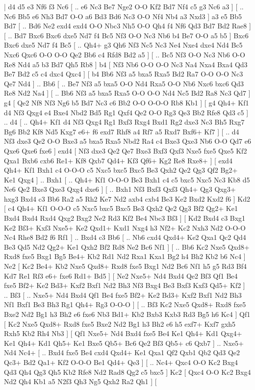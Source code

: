 \makegametitle 
|   d4   d5    e3   Nf6    f3  Nc6 [ .. e6  Nc3 Be7  Nge2 O-O  Kf2 Bd7  Nf4 c5  g3 Nc6  a3   ]  [ .. Nc6  Bb5 e6  Nh3 Bd7  O-O a6  Bd3 Bd6  Nc3 O-O  Nf4 Nb4  a3 Nxd3   ]  a3   e5    Bb5   Bd7 [ .. Bd6  Ne2 exd4  exd4 O-O  Nbc3 Nh5  O-O Qh4  f4 Nf6  Qd3 Bd7  Bd2 Rae8   ]  [ .. Bd7  Bxc6 Bxc6  dxe5 Nd7  f4 Bc5  Nf3 O-O  Nc3 Nb6  b4 Be7  O-O a5  b5   ]  Bxc6   Bxc6    dxe5   Nd7    f4   Bc5 [ .. Qh4+  g3 Qh6  Nf3 Nc5  Nc3 Ne4  Nxe4 dxe4  Nd4 Bc5  Nxc6 Qxc6  O-O O-O  Qe2 Bb6  c4 Rfd8  Bd2 a5   ]  [ .. Bc5  Nf3 O-O  Nc3 Nb6  O-O Re8  Nd4 a5  b3 Bd7  Qh5 Rb8   ]  b4 [  Nf3 Nb6  O-O O-O  Nc3 Na4  Nxa4 Bxa4  Qd3 Be7  Bd2 c5  c4 dxc4  Qxc4   ]  [  b4 Bb6  Nf3 a5  bxa5 Rxa5  Bd2 Ra7  O-O O-O  Nc3 Qe7  Nd4   ] .. Bb6    [ .. Be7  Nf3 a5  bxa5 O-O  Nd4 Rxa5  O-O Nb6  Nxc6 bxc6  Qd3 Re8  Nd2 Na4   ]  [ .. Bb6  Nf3 a5  bxa5 Rxa5  O-O O-O  Nd4 Nc5  Bd2 Ra8  Nc3 Qd7   ]  g4 [  Qe2 Nf8  Nf3 Ng6  b5 Bd7  Nc3 c6  Bb2 O-O  O-O-O Rb8  Kb1   ]  [  g4 Qh4+  Kf1 d4  Nf3 Qxg4  e4 Bxe4  Nbd2 Bd5  Rg1 Qxf4  Qe2 O-O  Rg3 Qe3  Bb2 Rfe8  Qd3 c5   ] .. d4 [ .. Qh4+  Kf1 d4  Nf3 Qxg4  Rg1 Bxf3  Rxg4 Bxd1  Rg2 dxe3  Nc3 Bh5  Rxg7 Bg6  Bb2 Kf8  Nd5 Kxg7  e6+ f6  exd7 Rhf8  a4 Rf7  a5 Rxd7  Bxf6+ Kf7   ]  [ .. d4  Nf3 dxe3  Qe2 O-O  Bxe3 a5  bxa5 Rxa5  Nbd2 Ra4  c4 Bxe3  Qxe3 Nb6  O-O Qd7  e6 Qxe6  Qxe6 fxe6   ]  exd4 [  Nf3 dxe3  Qe2 Qe7  Bxe3 Bxf3  Qxf3 Nxe5  fxe5 Qxe5  Kf2 Qxa1  Bxb6 cxb6  Re1+ Kf8  Qxb7 Qd4+  Kf3 Qf6+  Kg2 Re8  Rxe8+   ]  [  exd4 Qh4+  Kf1 Bxh1  c4 O-O-O  c5 Nxc5  bxc5 Bxc5  Be3 Qxh2  Qe2 Qg3  Qf2 Bg2+  Ke1 Qxg4   ] .. Bxh1 [ .. Qh4+  Kf1 O-O-O  Be3 Bxh1  c4 c5  bxc5 Nxc5  Nc3 Kb8  d5 Ne6  Qe2 Bxe3  Qxe3 Qxg4  dxe6   ]  [ .. Bxh1  Nf3 Bxf3  Qxf3 Qh4+  Qg3 Qxg3+  hxg3 Bxd4  c3 Bb6  Ra2 a5  Rh2 Ke7  Nd2 axb4  cxb4 Be3  Ke2 Bxd2  Kxd2 f6   ]  Kd2 [  c4 Qh4+  Kf1 O-O-O  c5 Nxc5  bxc5 Bxc5  Be3 Qxh2  Qe2 Qg3  Bf2 Qg2+  Ke1 Bxd4  Bxd4 Rxd4  Qxg2 Bxg2  Ne2 Rd3  Kf2 Be4  Nbc3 Bf3   ]  [  Kd2 Bxd4  c3 Bxg1  Ke2 Bf3+  Kxf3 Nxe5+  Ke2 Qxd1+  Kxd1 Nxg4  h3 Nf2+  Kc2 Nxh3  Nd2 O-O-O  Nc4 Rhe8  Bd2 f6  Rf1   ] .. Bxd4    c3   Bb6 [ .. Nb6  cxd4 Qxd4+  Ke2 Qxa1  Qc2 Qd4  Be3 Qd5  Nd2 Qg2+  Ke1 Qxh2  Bf2 Rd8  Ne2 Bc6  Nf1   ]  [ .. Bb6  Kc2 Nxe5  Qxd8+ Rxd8  fxe5 Bxg1  Bg5 Be4+  Kb2 Rd1  Nd2 Rxa1  Kxa1 Bg2  h4 Bh2  Kb2 b6  Nc4   ]  Ne2 [  Kc2 Be4+  Kb2 Nxe5  Qxd8+ Rxd8  fxe5 Bxg1  Nd2 Bc6  Nf1 h5  g5 Rd3  Bf4 Kd7  Re1 Rf3  e6+ fxe6  Rd1+ Bd5   ]  [  Ne2 Nxe5+  Nd4 Bxd4  Qe2 Bf3  Qf1 Be4  fxe5 Bf2+  Ke2 Bd3+  Kxf2 Bxf1  Nd2 Bh3  Nf3 Bxg4  Be3 Bxf3  Kxf3 Qd5+  Kf2   ] .. Bf3 [ .. Nxe5+  Nd4 Bxd4  Qf1 Be4  fxe5 Bf2+  Ke2 Bd3+  Kxf2 Bxf1  Nd2 Bh3  Nf1 Bxf1  Be3 Bh3  Rg1 Qh4+  Rg3 O-O-O   ]  [ .. Bf3  Kc2 Nxe5  Qxd8+ Rxd8  fxe5 Bxe2  Nd2 Bg1  h3 Bh2  e6 fxe6  Nb3 Bd1+  Kb2 Bxb3  Kxb3 Rd3  Bg5 h6  Kc4   ]  Qf1 [  Kc2 Nxe5  Qxd8+ Rxd8  fxe5 Bxe2  Nd2 Bg1  h3 Bh2  e6 h5  exf7+ Kxf7  gxh5 Rxh5  Kb2 Rh4  Nb3   ]  [  Qf1 Nxe5+  Nd4 Bxd4  fxe5 Be4  Ke1 Qh4+  Kd1 Qxg4+  Ke1 Qh4+  Kd1 Qh5+  Ke1 Bxe5  Qb5+ Bc6  Qe2 Bf3  Qb5+ c6  Qxb7   ] .. Nxe5+    Nd4   Nc4+ [ .. Bxd4  fxe5 Be4  cxd4 Qxd4+  Ke1 Qxa1  Qf2 Qxb1  Qb2 Qd3  Qe2 Qc3+  Bd2 Qa1+  Kf2 O-O-O  Be1 Qd4+  Qe3   ]  [ .. Nc4+  Qxc4 O-O  Kc2 Bxg4  Qd3 Qh4  Qg3 Qh5  Kb2 Rfe8  Nd2 Rad8  Qg2 c5  bxc5   ]  Kc2 [  Qxc4 O-O  Kc2 Bxg4  Nd2 Qh4  Kb1 a5  N2f3 Qh3  Ng5 Qxh2  Ra2 Qh1   ]  [  